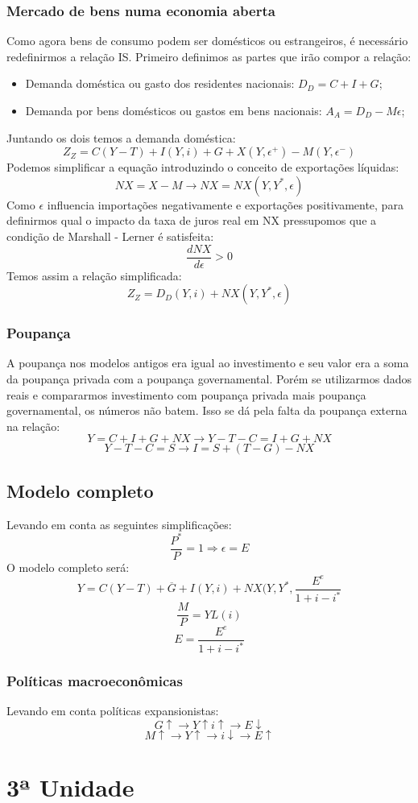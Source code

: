 \documentclass[12pt,a4paper,oneside,brazil]{abntex2}
\begin{document}
\subsection{Mercado de bens numa economia aberta}
Como agora bens de consumo podem ser domésticos ou estrangeiros, é necessário redefinirmos a relação IS. Primeiro definimos as partes que irão compor a relação:
\begin{itemize}
\item Demanda doméstica ou gasto dos residentes nacionais: $D_D = C + I + G$;
\item Demanda por bens domésticos ou gastos em bens nacionais: $A_A = D_D - M \epsilon$;
\end{itemize}
Juntando os dois temos a demanda doméstica:
\[ Z_Z = C (Y - T) + I ( Y, i) + G + X (Y, \epsilon^+) - M (Y, \epsilon^-) \]
Podemos simplificar a equação introduzindo o conceito de exportações líquidas:
\[ NX = X - M \rightarrow NX = NX(Y, Y^{*}, \epsilon) \]
Como $\epsilon$ influencia importações negativamente e exportações positivamente, para definirmos qual o impacto da taxa de juros real em NX pressupomos que a condição de Marshall - Lerner é satisfeita:
\[ \frac{d NX}{d \epsilon} > 0\]
Temos assim a relação simplificada:
\[ Z_Z = D_D ( Y, i ) + NX (Y, Y^{*}, \epsilon) \]

\subsection{Poupança}
A poupança nos modelos antigos era igual ao investimento e seu valor era a soma da poupança privada com a poupança governamental. Porém se utilizarmos dados reais e compararmos investimento com poupança privada mais poupança governamental, os números não batem. Isso se dá pela falta da poupança externa na relação:
\[ Y  = C + I + G + NX \rightarrow Y - T - C  = I + G + NX\]
\[ Y - T -C = S \rightarrow I = S + (T -G) - NX \]

\section{Modelo completo}
Levando em conta as seguintes simplificações:
\[ \frac{P^{*}}{P} = 1 \Rightarrow  \epsilon = E\]
O modelo completo será:
\begin{equation}\label{IS}
Y = C (Y - T) + \overline{G} + I  (Y, i ) + NX ( Y, Y^{*}, \frac{E^e}{1 + i - i^{*}}
\end{equation}
\begin{equation}\label{LM}
\frac{M}{P} = Y L (i)
\end{equation}
\begin{equation}\label{E}
E = \frac{E^e}{1 + i - i^{*}}
\end{equation}

\subsection{Políticas macroeconômicas}
Levando em conta políticas expansionistas:
\[ G \uparrow  \rightarrow Y \uparrow i \uparrow \rightarrow E\downarrow\]
\[ M \uparrow \rightarrow Y \uparrow \rightarrow i \downarrow \rightarrow E \uparrow\]

\chapter{3ª Unidade}

\printbibliography
\end{document}
